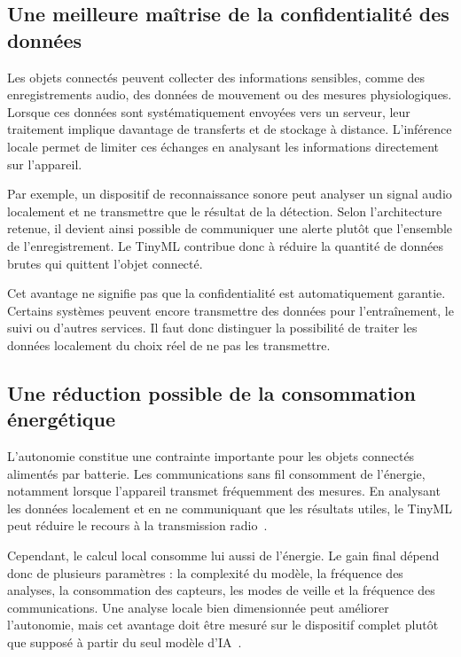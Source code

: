 \subsection{Une meilleure maîtrise de la confidentialité des données}

Les objets connectés peuvent collecter des informations sensibles, comme des
enregistrements audio, des données de mouvement ou des mesures physiologiques.
Lorsque ces données sont systématiquement envoyées vers un serveur, leur
traitement implique davantage de transferts et de stockage à distance.
L'inférence locale permet de limiter ces échanges en analysant les informations
directement sur l'appareil.

Par exemple, un dispositif de reconnaissance sonore peut analyser un signal
audio localement et ne transmettre que le résultat de la détection. Selon
l'architecture retenue, il devient ainsi possible de communiquer une alerte
plutôt que l'ensemble de l'enregistrement. Le TinyML contribue donc à réduire
la quantité de données brutes qui quittent l'objet connecté.

Cet avantage ne signifie pas que la confidentialité est automatiquement
garantie. Certains systèmes peuvent encore transmettre des données pour
l'entraînement, le suivi ou d'autres services. Il faut donc distinguer la
possibilité de traiter les données localement du choix réel de ne pas les
transmettre.

\subsection{Une réduction possible de la consommation énergétique}

L'autonomie constitue une contrainte importante pour les objets connectés
alimentés par batterie. Les communications sans fil consomment de l'énergie,
notamment lorsque l'appareil transmet fréquemment des mesures. En analysant les
données localement et en ne communiquant que les résultats utiles, le TinyML
peut réduire le recours à la transmission radio~\cite{warden2019tinyml}.

Cependant, le calcul local consomme lui aussi de l'énergie. Le gain final
dépend donc de plusieurs paramètres : la complexité du modèle, la fréquence des
analyses, la consommation des capteurs, les modes de veille et la fréquence des
communications. Une analyse locale bien dimensionnée peut améliorer
l'autonomie, mais cet avantage doit être mesuré sur le dispositif complet
plutôt que supposé à partir du seul modèle d'IA~\cite{banbury2021mlperftiny}.

